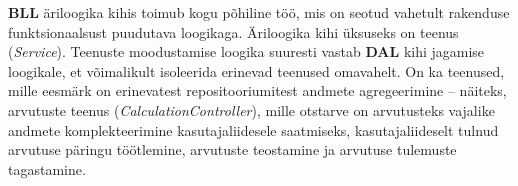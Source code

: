 \textbf{BLL} äriloogika kihis toimub kogu põhiline töö, mis on seotud vahetult rakenduse funktsionaalsust puudutava loogikaga.
Äriloogika kihi üksuseks on teenus (\textit{Service}). Teenuste moodustamise loogika suuresti vastab \textbf{DAL} kihi jagamise loogikale,
et võimalikult isoleerida erinevad teenused omavahelt. On ka teenused, mille eesmärk on erinevatest repositooriumitest andmete agregeerimine --
näiteks, arvutuste teenus (\textit{CalculationController}), mille otstarve on arvutusteks vajalike andmete komplekteerimine kasutajaliidesele
saatmiseks, kasutajaliideselt tulnud arvutuse päringu töötlemine, arvutuste teostamine ja arvutuse tulemuste tagastamine. 





